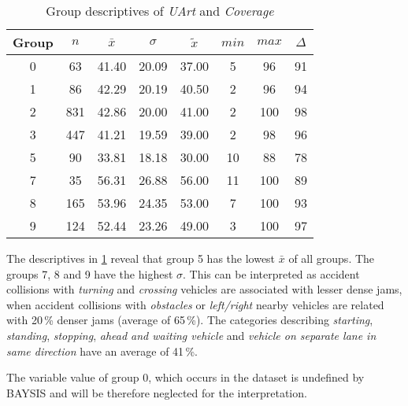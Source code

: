 \begin{table}[ht!]
	\tiny
	\centering
	\begin{tabular}{c|c|c|c|c|c|c|c}
		\toprule
		Group & $n$ & $\bar{x}$ & $\sigma$ & $\tilde{x}$ & $min$ & $max$ & $\Delta$ \\ 
		\midrule
		0 & 63  & 41.40 & 20.09 & 37.00 & 5  & 96  & 91 \\ 
		1 & 86  & 42.29 & 20.19 & 40.50 & 2  & 96  & 94 \\ 
		2 & 831 & 42.86 & 20.00 & 41.00 & 2  & 100 & 98 \\ 
		3 & 447 & 41.21 & 19.59 & 39.00 & 2  & 98  & 96 \\  
		5 & 90  & 33.81 & 18.18 & 30.00 & 10 & 88  & 78 \\ 
		7 & 35  & 56.31 & 26.88 & 56.00 & 11 & 100 & 89 \\ 
		8 & 165 & 53.96 & 24.35 & 53.00 & 7  & 100 & 93 \\ 
		9 & 124 & 52.44 & 23.26 & 49.00 & 3  & 100 & 97 \\ 
		\bottomrule
	\end{tabular}
	\caption{Group descriptives of \textit{UArt} and \textit{Coverage}}
	\label{tbl:descriptives_baysis_matched_UArt_Cov}
\end{table}
The descriptives in \cref{tbl:descriptives_baysis_matched_UArt_Cov} reveal that group 5 has the lowest $\bar{x}$ of all groups. The groups 7, 8 and 9 have the highest $\sigma$. This can be interpreted as accident collisions with \textit{turning} and \textit{crossing} vehicles are associated with lesser dense jams, when accident collisions with \textit{obstacles} or \textit{left/right} nearby vehicles are related with 20\,\% denser jams (average of 65\,\%). The categories describing \textit{starting}, \textit{standing}, \textit{stopping}, \textit{ahead and waiting vehicle} and \textit{vehicle on separate lane in same direction} have an average of 41\,\%.

 The variable value of group 0, which occurs in the dataset is undefined by BAYSIS and will be therefore neglected for the interpretation.  

